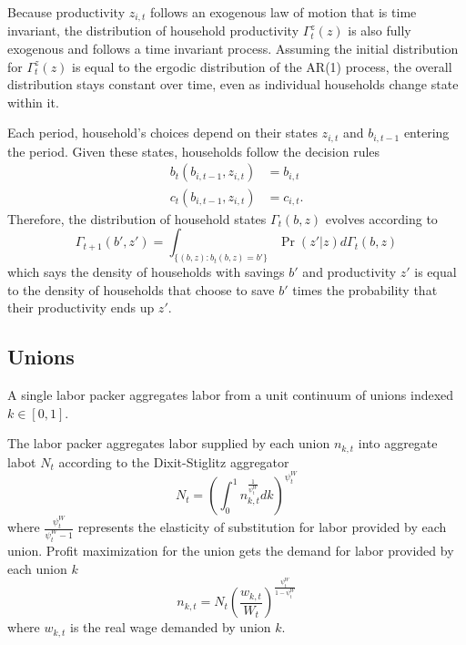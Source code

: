 Because productivity $z_{i, t}$ follows an exogenous law of motion that is time invariant, the distribution of household productivity $\Gamma_t^z (z)$ is also fully exogenous and follows a time invariant process. Assuming the initial distribution for $\Gamma_t^z (z)$ is equal to the ergodic distribution of the AR(1) process, the overall distribution stays constant over time, even as individual households change state within it.

Each period, household's choices depend on their states $z_{i, t}$ and $b_{i, t - 1}$ entering the period. Given these states, households follow the decision rules
\begin{align*}
    b_t (b_{i, t-1}, z_{i, t}) &= b_{i, t} \\
    c_t (b_{i, t-1}, z_{i, t}) &= c_{i, t}.
\end{align*}
Therefore, the distribution of household states $\Gamma_t (b, z)$ evolves according to
\begin{equation*}
    \Gamma_{t + 1} (b', z') = \int_{\{(b, z) : b_t(b, z) = b'\}} \Pr (z' | z) d \Gamma_t (b, z)
\end{equation*}
which says the density of households with savings $b'$ and productivity $z'$ is equal to the density of households that choose to save $b'$ times the probability that their productivity ends up $z'$.


\subsection{Unions} \label{subsec:unions}

A single labor packer aggregates labor from a unit continuum of unions indexed $k \in [0, 1]$.

The labor packer aggregates labor supplied by each union $n_{k,t}$ into aggregate labot $N_t$ according to the Dixit-Stiglitz aggregator
\begin{equation*}
    N_t = \left(\int_0^1 n_{k, t}^\frac{1}{\psi_t^W} dk\right)^{\psi_t^W}
\end{equation*}
where $\frac{\psi_t^W}{\psi_t^W - 1}$ represents the elasticity of substitution for labor provided by each union. Profit maximization for the union gets the demand for labor provided by each union $k$
\begin{equation*}
    n_{k, t} = N_t \left(\frac{w_{k, t}}{W_t}\right)^\frac{\psi_t^W}{1 - \psi_t^W}
\end{equation*}
where $w_{k, t}$ is the real wage demanded by union $k$.

